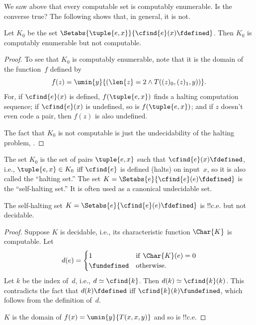 \documentclass[../../../include/open-logic-section]{subfiles}
\begin{document}


We saw above that every computable set is computably enumerable. Is
the converse true? The following shows that, in general, it is not.

\begin{thm}
Let $K_0$ be the set $\Setabs{\tuple{e, x}}{\cfind{e}(x) \fdefined}$.
Then $K_0$ is computably enumerable but not computable.
\end{thm}

\begin{proof}
To see that $K_0$ is computably enumerable, note that it is the
domain of the function~$f$ defined by
\[
f(z) = \umin{y}{(\len{z} = 2 \land T((z)_0, (z)_1, y))}.
\]
For, if $\cfind{e}(x)$ is defined, $f(\tuple{e, x})$ finds a halting
computation sequence; if $\cfind{e}(x)$ is undefined, so is
$f(\tuple{e, x})$; and if $z$ doesn't even code a pair, then $f(z)$ is
also undefined.

The fact that $K_0$ is not computable is just the undecidability of
the halting problem, .
\end{proof}

The set $K_0$ is the set of pairs $\tuple{e,x}$ such that
$\cfind{e}(x) \fdefined$, i.e., $\tuple{e,x} \in K_0$ iff $\cfind{e}$
is defined (halts) on input~$x$, so it is also called the ``halting
set.'' The set $K = \Setabs{e}{\cfind{e}(e) \fdefined}$ is the
``self-halting set.'' It is often used as a canonical undecidable set.

\begin{thm}
The self-halting set $K = \Setabs{e}{\cfind{e}(e) \fdefined}$ is
!!{c.e.} but not decidable.
\end{thm}

\begin{proof}
  Suppose $K$ is decidable, i.e., its characteristic function
  $\Char{K}$ is computable. Let 
  \[d(e) = \begin{cases}
  1 & \text{if\/ $\Char{K}(e) = 0$}\\
  \fundefined & \text{otherwise.}
  \end{cases}
  \] 
  Let $k$ be the index of~$d$, i.e., $d \simeq \cfind{k}$. Then $d(k)
  \simeq \cfind{k}(k)$. This contradicts the fact that $d(k)
  \fdefined$ iff $\cfind{k}(k) \fundefined$, which follows from the
  definition of~$d$.

  $K$ is the domain of $f(x) = \umin{y}{T(x,x,y)}$ and so is !!{c.e.}
\end{proof}
\end{document}
